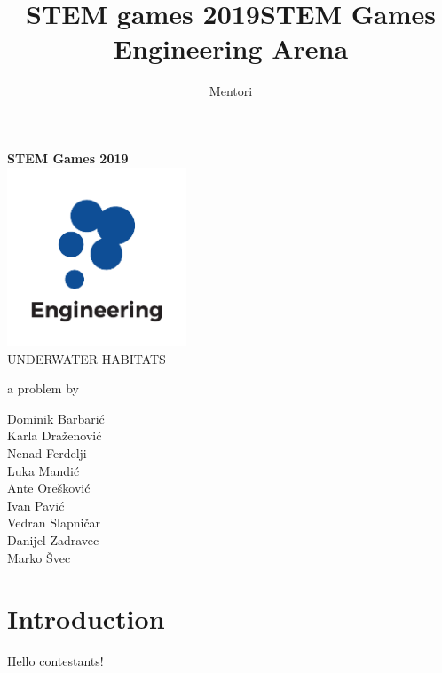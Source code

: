\documentclass{article}
\title{STEM games 2019}
\author{Mentori}
\title{STEM Games Engineering Arena}
\date{}
\begin{document}
	
	\thispagestyle{empty}
	\newpage
	\thispagestyle{empty}
	\vspace*{0cm}
	\begin{center}
		
		\textbf{\Huge{STEM Games 2019}}\\
		\vspace*{2.4cm}
		\includegraphics[width=0.4\textwidth]{logos/engineering} \\
		\vspace*{2.4cm}
		\huge{UNDERWATER HABITATS}
		
		\medskip
		
		\normalsize{a problem by}
		
		\medskip
		
		Dominik Barbarić \\
		Karla Draženović \\
		Nenad Ferdelji \\
		Luka Mandić \\
		Ante Orešković \\
		Ivan Pavić \\
		Vedran Slapničar \\
		Danijel Zadravec \\
		Marko Švec 
		
		\vspace{6cm}
		
		
		\normalsize{}
	\end{center}
	
	\newpage
	
\section{Introduction}

Hello contestants!
\end{document}
